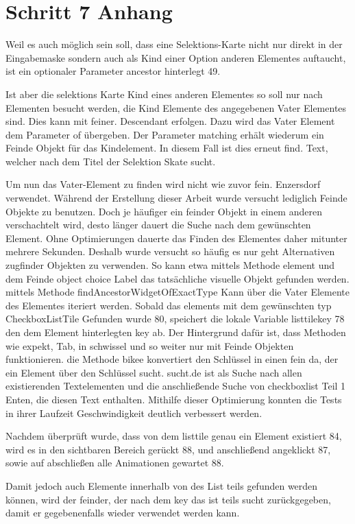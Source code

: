 \chapter{Schritt 7 Anhang} 
\label{appendix:Schritt7Anhang}


Weil es auch möglich sein soll, dass eine Selektions-Karte nicht nur direkt in der Eingabemaske sondern  auch als Kind einer Option anderen Elementes auftaucht, ist ein optionaler Parameter ancestor hinterlegt 49.

Ist aber die selektions Karte Kind eines anderen Elementes  so soll nur nach Elementen besucht werden, die Kind Elemente des angegebenen Vater Elementes sind. Dies kann mit feiner. Descendant erfolgen. Dazu wird das Vater Element dem Parameter of übergeben. Der Parameter matching erhält wiederum ein Feinde Objekt für das Kindelement. In diesem Fall ist dies erneut find. Text, welcher nach dem Titel der Selektion Skate sucht.


Um nun das Vater-Element zu finden wird nicht wie zuvor fein. Enzersdorf verwendet.
Während der Erstellung dieser Arbeit wurde versucht lediglich Feinde Objekte zu benutzen. Doch je häufiger ein feinder Objekt in einem anderen verschachtelt wird, desto länger dauert die Suche nach dem gewünschten Element. Ohne Optimierungen dauerte das Finden des Elementes  daher mitunter mehrere Sekunden. Deshalb wurde versucht so häufig es nur geht Alternativen  zugfinder  Objekten zu verwenden. So kann etwa mittels Methode element  und dem Feinde object choice Label das tatsächliche   visuelle Objekt gefunden werden.  mittels Methode findAncestorWidgetOfExactType Kann über die Vater Elemente des Elementes iteriert werden. Sobald das elements mit dem gewünschten typ CheckboxListTile Gefunden wurde  80,  speichert die lokale Variable listtilekey 78  den dem Element hinterlegten key ab.  Der Hintergrund dafür ist, dass Methoden wie expekt, Tab, in schwissel und so weiter nur mit Feinde Objekten funktionieren.   die Methode bikee   konvertiert den Schlüssel in einen fein da, der ein Element über den Schlüssel sucht.  sucht.de ist als Suche nach allen existierenden Textelementen und die anschließende Suche von checkboxlist Teil 1 Enten, die diesen Text enthalten. Mithilfe dieser Optimierung konnten die Tests in ihrer Laufzeit Geschwindigkeit deutlich verbessert werden.

Nachdem überprüft wurde, dass von dem listtile genau ein Element existiert 84, wird es in den sichtbaren Bereich gerückt 88, und anschließend  angeklickt 87, sowie auf abschließen alle Animationen gewartet 88.


Damit jedoch auch Elemente innerhalb von des List teils gefunden werden können,  wird der feinder, der nach dem key das ist teils sucht zurückgegeben, damit er gegebenenfalls wieder verwendet werden kann.
